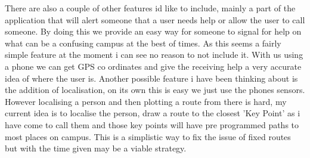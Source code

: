\documentclass[10pt,a4paper]{article}
\begin{document}
\noindent 
There are also a couple of other features id like to include, mainly a part of the application that will alert someone that a user needs help or allow the user to call someone. By doing this we provide an easy way for someone to signal for help on what can be a confusing campus at the best of times. As this seems a fairly simple feature at the moment i can see no reason to not include it. With us using a phone we can get GPS co ordinates and give the receiving help a very accurate idea of where the user is. Another possible feature i have been thinking about is the addition of localisation, on its own this is easy we just use the phones sensors. However localising a person and then plotting a route from there is hard, my current idea is to localise the person, draw a route to the closest 'Key Point' as i have come to call them and those key points will have pre programmed paths to most places on campus. This is a simplistic way to fix the issue of fixed routes but with the time given may be a viable strategy.\\
\end{document}
